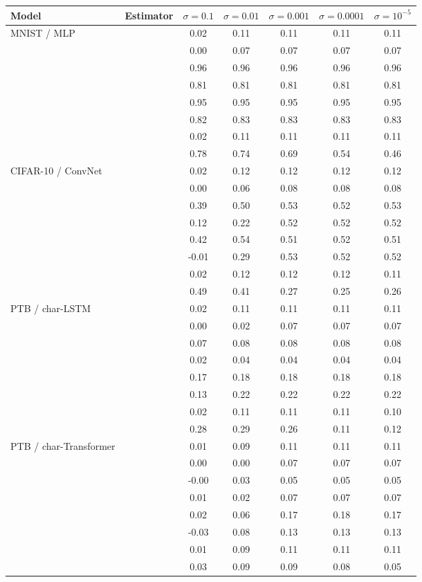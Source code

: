 \begin{tabular}{l l ccccc}
\toprule
Model & Estimator & $\sigma=0.1$ & $\sigma=0.01$ & $\sigma=0.001$ & $\sigma=0.0001$ & $\sigma=10^{-5}$ \\
\midrule
MNIST / MLP & \SPSA{} & 0.02 & 0.11 & 0.11 & 0.11 & 0.11 \\
 & \RS{} & 0.00 & 0.07 & 0.07 & 0.07 & 0.07 \\
 & \NP{} & 0.96 & 0.96 & 0.96 & 0.96 & 0.96 \\
 & \ANP{} & 0.81 & 0.81 & 0.81 & 0.81 & 0.81 \\
 & \INP{} & 0.95 & 0.95 & 0.95 & 0.95 & 0.95 \\
 & \DANP{} & 0.82 & 0.83 & 0.83 & 0.83 & 0.83 \\
 & \SPSAb{} & 0.02 & 0.11 & 0.11 & 0.11 & 0.11 \\
 & \ANPb{} & 0.78 & 0.74 & 0.69 & 0.54 & 0.46 \\
\midrule
CIFAR-10 / ConvNet & \SPSA{} & 0.02 & 0.12 & 0.12 & 0.12 & 0.12 \\
 & \RS{} & 0.00 & 0.06 & 0.08 & 0.08 & 0.08 \\
 & \NP{} & 0.39 & 0.50 & 0.53 & 0.52 & 0.53 \\
 & \ANP{} & 0.12 & 0.22 & 0.52 & 0.52 & 0.52 \\
 & \INP{} & 0.42 & 0.54 & 0.51 & 0.52 & 0.51 \\
 & \DANP{} & -0.01 & 0.29 & 0.53 & 0.52 & 0.52 \\
 & \SPSAb{} & 0.02 & 0.12 & 0.12 & 0.12 & 0.11 \\
 & \ANPb{} & 0.49 & 0.41 & 0.27 & 0.25 & 0.26 \\
\midrule
PTB / char-LSTM & \SPSA{} & 0.02 & 0.11 & 0.11 & 0.11 & 0.11 \\
 & \RS{} & 0.00 & 0.02 & 0.07 & 0.07 & 0.07 \\
 & \NP{} & 0.07 & 0.08 & 0.08 & 0.08 & 0.08 \\
 & \ANP{} & 0.02 & 0.04 & 0.04 & 0.04 & 0.04 \\
 & \INP{} & 0.17 & 0.18 & 0.18 & 0.18 & 0.18 \\
 & \DANP{} & 0.13 & 0.22 & 0.22 & 0.22 & 0.22 \\
 & \SPSAb{} & 0.02 & 0.11 & 0.11 & 0.11 & 0.10 \\
 & \ANPb{} & 0.28 & 0.29 & 0.26 & 0.11 & 0.12 \\
\midrule
PTB / char-Transformer & \SPSA{} & 0.01 & 0.09 & 0.11 & 0.11 & 0.11 \\
 & \RS{} & 0.00 & 0.00 & 0.07 & 0.07 & 0.07 \\
 & \NP{} & -0.00 & 0.03 & 0.05 & 0.05 & 0.05 \\
 & \ANP{} & 0.01 & 0.02 & 0.07 & 0.07 & 0.07 \\
 & \INP{} & 0.02 & 0.06 & 0.17 & 0.18 & 0.17 \\
 & \DANP{} & -0.03 & 0.08 & 0.13 & 0.13 & 0.13 \\
 & \SPSAb{} & 0.01 & 0.09 & 0.11 & 0.11 & 0.11 \\
 & \ANPb{} & 0.03 & 0.09 & 0.09 & 0.08 & 0.05 \\
\bottomrule
\end{tabular}
